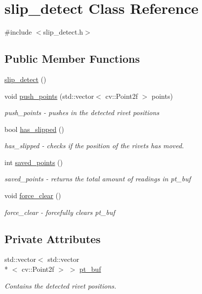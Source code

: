 \hypertarget{classslip__detect}{\section{slip\-\_\-detect Class Reference}
\label{classslip__detect}
}


{\ttfamily \#include $<$slip\-\_\-detect.\-h$>$}

\subsection*{Public Member Functions}
\begin{DoxyCompactItemize}
\item 
\hyperlink{classslip__detect_a866b11a21593cef090d147946f7a5f39}{slip\-\_\-detect} ()
\item 
void \hyperlink{classslip__detect_ae6e6e443b198e92fa399d77353efc5c3}{push\-\_\-points} (std\-::vector$<$ cv\-::\-Point2f $>$ points)
\begin{DoxyCompactList}\small\item\em push\-\_\-points -\/ pushes in the detected rivet positions \end{DoxyCompactList}\item 
bool \hyperlink{classslip__detect_a678335a2cce7af89c9f04c2b958b6c0a}{has\-\_\-slipped} ()
\begin{DoxyCompactList}\small\item\em has\-\_\-slipped -\/ checks if the position of the rivets has moved. \end{DoxyCompactList}\item 
int \hyperlink{classslip__detect_ae6b88ed6c11f2d4a028d591885f8991e}{saved\-\_\-points} ()
\begin{DoxyCompactList}\small\item\em saved\-\_\-points -\/ returns the total amount of readings in pt\-\_\-buf \end{DoxyCompactList}\item 
void \hyperlink{classslip__detect_a9b082bab66a5314fea7e40c8ca7dda0b}{force\-\_\-clear} ()
\begin{DoxyCompactList}\small\item\em force\-\_\-clear -\/ forcefully clears pt\-\_\-buf \end{DoxyCompactList}\end{DoxyCompactItemize}
\subsection*{Private Attributes}
\begin{DoxyCompactItemize}
\item 
std\-::vector$<$ std\-::vector\\*
$<$ cv\-::\-Point2f $>$ $>$ \hyperlink{classslip__detect_ae868f7939dc3d14aaa8341a045bb48fc}{pt\-\_\-buf}
\begin{DoxyCompactList}\small\item\em Contains the detected rivet positions. \end{DoxyCompactList}\end{DoxyCompactItemize}


